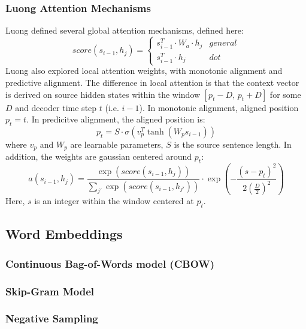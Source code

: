 \documentclass[twoside,twocolumn]{article}
\begin{document}
\subsubsection{Luong Attention Mechanisms}
Luong defined several global attention mechanisms, defined here:
\begin{equation}
  score(s_{i-1}, h_j) =
    \begin{cases}
      s_{i-1}^T \cdot W_a \cdot h_j & general \\
      s_{i-1}^T \cdot h_j & dot
    \end{cases}
\end{equation}
Luong also explored local attention weights, with monotonic alignment and
predictive alignment. The difference in local attention is that the
context vector is derived on source hidden states within the window
$\left[p_t - D , \, p_t + D\right]$ for some $D$ and decoder time step $t$ (i.e. $i-1$).
In monotonic alignment, aligned position $p_t=t$.
In predicitve alignment, the aligned position is:
\begin{equation}
  p_t = S \cdot \sigma \left( v_p^T \tanh \left( W_p s_{i-1} \right) \right)
\end{equation}
where $v_p$ and $W_p$ are learnable parameters,
$S$ is the source sentence length. In addition, the weights are gaussian centered
around $p_t$:
\begin{equation}
  a(s_{i-1}, h_j) = \frac{\exp(score(s_{i-1}, h_j))}{\sum_{j'} \exp(score(s_{i-1}, h_{j'}))} \cdot \exp\left(-\frac{(s-p_t)^2}{2\left(\frac{D}{2}\right)^2}\right)
\end{equation}
Here, $s$ is an integer within the window centered at $p_t$.


\subsection{Word Embeddings}
\subsubsection{Continuous Bag-of-Words model (CBOW)}
\subsubsection{Skip-Gram Model}
\subsubsection{Negative Sampling}




% 
% 

\end{document}

